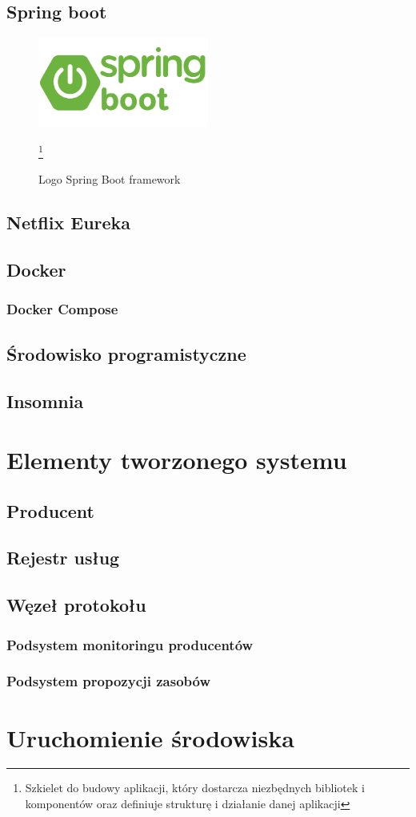 \subsection{Spring boot}

\begin{figure}
    \centering
    \includegraphics[width=0.5\textwidth]{images/springBootLogo.png}
    \caption{Logo Spring Boot framework} \footnote{Szkielet do budowy aplikacji, który dostarcza niezbędnych bibliotek i komponentów oraz definiuje strukturę i działanie danej aplikacji\cite{frameworkDef}}
    \label{fig:enter-label}
\end{figure}


\subsection{Netflix Eureka}
\subsection{Docker}
\subsubsection{Docker Compose}
\subsection{Środowisko programistyczne}
\subsection{Insomnia}




\section{Elementy tworzonego systemu}

\subsection{Producent}
\subsection{Rejestr usług}
\subsection{Węzeł protokołu}
\subsubsection{Podsystem monitoringu producentów}
\subsubsection{Podsystem propozycji zasobów}

\section{Uruchomienie środowiska}